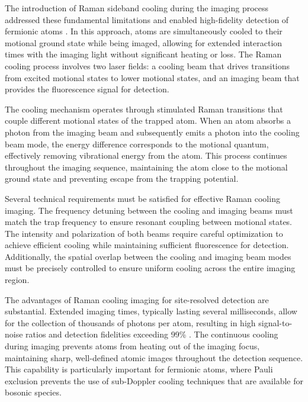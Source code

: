 The introduction of Raman sideband cooling during the imaging process addressed these fundamental limitations and enabled high-fidelity detection of fermionic atoms \cite{lester_raman_2014,cheuk_quantum-gas_2015,preiss_quantum_2015}. In this approach, atoms are simultaneously cooled to their motional ground state while being imaged, allowing for extended interaction times with the imaging light without significant heating or loss. The Raman cooling process involves two laser fields: a cooling beam that drives transitions from excited motional states to lower motional states, and an imaging beam that provides the fluorescence signal for detection.

The cooling mechanism operates through stimulated Raman transitions that couple different motional states of the trapped atom. When an atom absorbs a photon from the imaging beam and subsequently emits a photon into the cooling beam mode, the energy difference corresponds to the motional quantum, effectively removing vibrational energy from the atom. This process continues throughout the imaging sequence, maintaining the atom close to the motional ground state and preventing escape from the trapping potential.

Several technical requirements must be satisfied for effective Raman cooling imaging. The frequency detuning between the cooling and imaging beams must match the trap frequency to ensure resonant coupling between motional states. The intensity and polarization of both beams require careful optimization to achieve efficient cooling while maintaining sufficient fluorescence for detection. Additionally, the spatial overlap between the cooling and imaging beam modes must be precisely controlled to ensure uniform cooling across the entire imaging region.

The advantages of Raman cooling imaging for site-resolved detection are substantial. Extended imaging times, typically lasting several milliseconds, allow for the collection of thousands of photons per atom, resulting in high signal-to-noise ratios and detection fidelities exceeding 99\% \cite{cheuk_quantum-gas_2015}. The continuous cooling during imaging prevents atoms from heating out of the imaging focus, maintaining sharp, well-defined atomic images throughout the detection sequence. This capability is particularly important for fermionic atoms, where Pauli exclusion prevents the use of sub-Doppler cooling techniques that are available for bosonic species.


